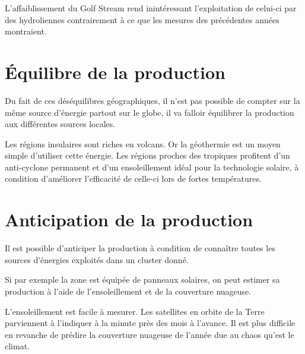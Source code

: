 L'affaiblissement du Golf Stream rend inintéressant l'exploitation de celui-ci par des hydroliennes contrairement
à ce que les mesures des précédentes années montraient.


\section{Équilibre de la production}

Du fait de ces déséquilibres géographiques, il n'est pas possible de compter sur la même source d'énergie partout
sur le globe, il va falloir équilibrer la production aux différentes sources locales.

Les régions insulaires sont riches en volcans. Or la géothermie est un moyen simple d'utiliser cette énergie.
Les régions proches des tropiques profitent d'un anti-cyclone permanent et d'un ensoleillement
idéal pour la technologie solaire, à condition d'améliorer l'efficacité de celle-ci lors de fortes températures.

\section{Anticipation de la production}

Il est possible d'anticiper la production à condition de connaître toutes les sources d'énergies
exploités dans un cluster donné.

Si par exemple la zone est équipée de panneaux solaires, on peut estimer sa production à l'aide de
l'ensoleillement et de la couverture nuageuse.

L'ensoleillement est facile à mesurer. Les satellites en orbite de la Terre parviennent à l'indiquer à la minute près
des mois à l'avance.
Il est plus difficile en revanche de prédire la couverture nuageuse de l'année due au chaos qu'est le climat.
